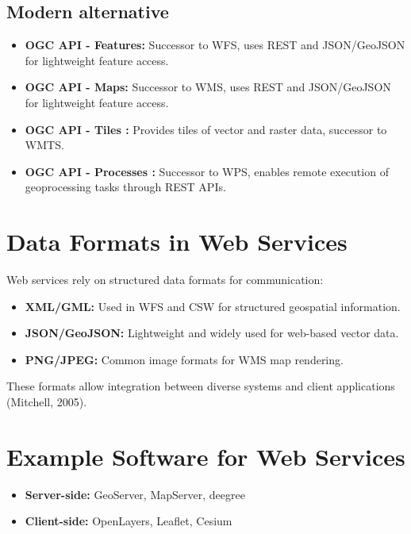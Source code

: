 \documentclass[
  11pt,
  letterpaper,
]{book}
\providecommand{\tightlist}{%
  \setlength{\itemsep}{0pt}\setlength{\parskip}{0pt}}
\begin{document}
\subsection{Modern alternative}\label{modern-alternative}

\begin{itemize}
\tightlist
\item
  \textbf{OGC API - Features:} Successor to WFS, uses REST and
  JSON/GeoJSON for lightweight feature access.\\
\item
  \textbf{OGC API - Maps:} Successor to WMS, uses REST and JSON/GeoJSON
  for lightweight feature access.\\
\item
  \textbf{OGC API - Tiles :} Provides tiles of vector and raster data,
  successor to WMTS.\\
\item
  \textbf{OGC API - Processes :} Successor to WPS, enables remote
  execution of geoprocessing tasks through REST APIs.
\end{itemize}

\section{Data Formats in Web
Services}\label{data-formats-in-web-services}

Web services rely on structured data formats for communication:

\begin{itemize}
\tightlist
\item
  \textbf{XML/GML:} Used in WFS and CSW for structured geospatial
  information.\\
\item
  \textbf{JSON/GeoJSON:} Lightweight and widely used for web-based
  vector data.\\
\item
  \textbf{PNG/JPEG:} Common image formats for WMS map rendering.
\end{itemize}

These formats allow integration between diverse systems and client
applications (Mitchell, 2005).

\section{Example Software for Web
Services}\label{example-software-for-web-services}

\begin{itemize}
\tightlist
\item
  \textbf{Server-side:} GeoServer, MapServer, deegree\\
\item
  \textbf{Client-side:} OpenLayers, Leaflet, Cesium
\end{itemize}
\end{document}
